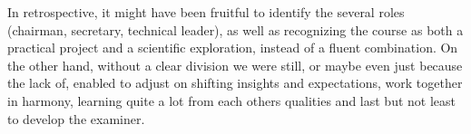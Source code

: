 In retrospective, it might have been fruitful to identify the several roles
(chairman, secretary, technical leader), as well as recognizing the course as
both a practical project and a scientific exploration, instead of a fluent
combination. On the other hand, without a clear division we were still, or maybe
even just because the lack of, enabled to adjust on shifting insights and expectations, 
work together in harmony, learning quite a lot from each others qualities and
last but not least to develop the \gls{examiner}.
